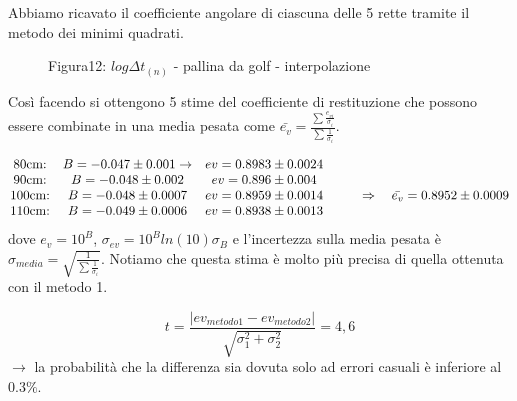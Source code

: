 \documentclass[a4paper]{article}
\theoremstyle{definition}
\begin{document}
	\noindent Abbiamo ricavato il coefficiente angolare di ciascuna delle 5 rette tramite il metodo dei minimi quadrati.
	
	\begin{figure}[!ht]
		\captionsetup{labelformat=empty}
		\caption{ Figura12: \(log\Delta t _{(n)}\) - pallina da golf - interpolazione}
	\end{figure}
	
	\noindent Così facendo si ottengono 5 stime del coefficiente di restituzione che possono essere combinate in una media pesata come \(\bar{e_{v}} = \frac{\sum\frac{e_{vi}}{\sigma_{i}}}{\sum\frac{1}{\sigma _{i}}}\).
	
	\[\begin{matrix}
		$80cm:$ &$\(B=-0.047\pm 0.001\rightarrow\)$& $\( ev= 0.8983\pm0.0024\)$ &  \\ 
		$90cm:$ & $\(B=-0.048\pm0.002\)$&$\(ev = 0.896\pm0.004\)$ &  \\ 
		$100cm:$ & $\(B=-0.048\pm 0.0007\)$& $\(ev =  0.8959\pm0.0014\)$ & $\(\qquad \Rightarrow \quad \bar{e_{v}} =0.8952 \pm 0.0009\)$\\ 
		$110cm:$ &$\(B=-0.049\pm 0.0006\)$& $\(ev = 0.8938\pm0.0013\)$ &  
	\end{matrix}\]
	dove \(e_{v}= 10^{B}\), \(\sigma_{ev} = 10^{B}ln(10)\sigma_{B}\) e l'incertezza sulla media pesata è \(\sigma _{media}=\sqrt{\frac{1}{\sum \frac{1}{\sigma _{i}}}}\). Notiamo che questa stima è molto più precisa di quella ottenuta con il metodo 1.
	
	\[t = \frac{ \left |ev_{metodo1}  - ev_{metodo2} \right |}{\sqrt{\sigma_{1}^{2}+ \sigma_{2}^{2}}} =  4,6 \]
\noindent \(\rightarrow\) la probabilità che la differenza sia dovuta solo ad errori casuali è inferiore al 0.3\(\%\).
\end{document}
